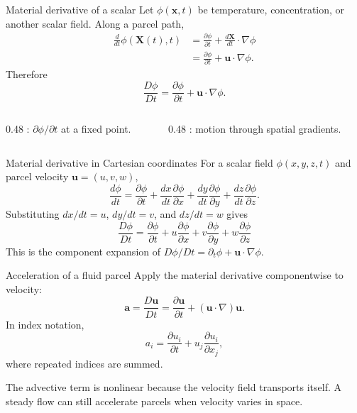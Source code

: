 \documentclass[aspectratio=169,11pt]{beamer}
\newcommand{\uvec}{\bm{u}}
\newcommand{\xvec}{\bm{x}}
\begin{document}
\begin{frame}{Material derivative of a scalar}
Let $\phi(\xvec,t)$ be temperature, concentration, or another scalar field. Along a parcel path,
\begin{align*}
  \frac{d}{dt}\phi(\mathbf{X}(t),t)
  &=\frac{\partial\phi}{\partial t}
    +\frac{d\mathbf{X}}{dt}\cdot\nabla\phi \\
  &=\frac{\partial\phi}{\partial t}
    +\uvec\cdot\nabla\phi.
\end{align*}
Therefore
\[
  \boxed{\frac{D\phi}{Dt}
  =\frac{\partial\phi}{\partial t}
  +\uvec\cdot\nabla\phi}.
\]
\begin{columns}[T,onlytextwidth]
\begin{column}{0.48\textwidth}
: $\partial\phi/\partial t$ at a fixed point.
\end{column}
\begin{column}{0.48\textwidth}
: motion through spatial gradients.
\end{column}
\end{columns}
\end{frame}

\begin{frame}{Material derivative in Cartesian coordinates}
For a scalar field $\phi(x,y,z,t)$ and parcel velocity $\uvec=(u,v,w)$,
\[
  \frac{d\phi}{dt}
  =\frac{\partial\phi}{\partial t}
  +\frac{dx}{dt}\frac{\partial\phi}{\partial x}
  +\frac{dy}{dt}\frac{\partial\phi}{\partial y}
  +\frac{dz}{dt}\frac{\partial\phi}{\partial z}.
\]
Substituting $dx/dt=u$, $dy/dt=v$, and $dz/dt=w$ gives
\[
  \boxed{
  \frac{D\phi}{Dt}
  =\frac{\partial\phi}{\partial t}
  +u\frac{\partial\phi}{\partial x}
  +v\frac{\partial\phi}{\partial y}
  +w\frac{\partial\phi}{\partial z}}
\]
This is the component expansion of
$D\phi/Dt=\partial_t\phi+\uvec\cdot\nabla\phi$.
\end{frame}

\begin{frame}{Acceleration of a fluid parcel}
Apply the material derivative componentwise to velocity:
\[
  \boxed{
  \bm{a}
  =\frac{D\uvec}{Dt}
  =\frac{\partial\uvec}{\partial t}
  +(\uvec\cdot\nabla)\uvec
  }.
\]
In index notation,
\[
  a_i=\frac{\partial u_i}{\partial t}
  +u_j\frac{\partial u_i}{\partial x_j},
\]
where repeated indices are summed.

\begin{punchbox}
\small The advective term is nonlinear because the velocity field transports itself. A steady flow can still accelerate parcels when velocity varies in space.
\end{punchbox}
\end{frame}
\end{document}
